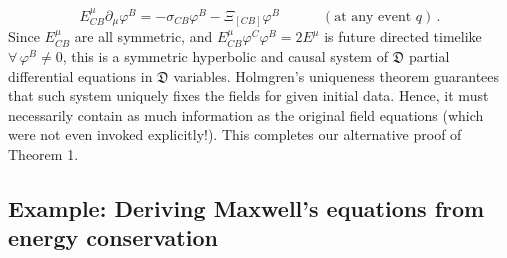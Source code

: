 \documentclass[aps,prl,singlecolumn,nofootinbib]{revtex4-2}
\newcommand{\spc}{\quad \quad \quad}
\theoremstyle{definition}
\theoremstyle{theorem}
\begin{document}
\begin{equation}\label{finally}
E^\mu_{CB}\partial_\mu \varphi^B =-\sigma_{CB} \varphi^B -\Xi_{[CB]}\varphi^B \spc (\text{at any event }q) \, .
\end{equation}
Since $E^\mu_{CB}$ are all symmetric, and $E^\mu_{CB}\varphi^C \varphi^B=2E^\mu$ is future directed timelike $\forall \, \varphi^B\neq 0$, this is a  symmetric hyperbolic and  causal \cite{Geroch_Lindblom_1991_causal} system of $\mathfrak{D}$ partial differential equations in $\mathfrak{D}$ variables. Holmgren's uniqueness theorem \cite{Rauch_book} guarantees that such system uniquely fixes the fields for given initial data. Hence, it must necessarily contain as much information as the original field equations (which were not even invoked explicitly!). This completes our alternative proof of Theorem 1.

\subsection{Example: Deriving Maxwell's equations from  energy conservation}
\end{document}

